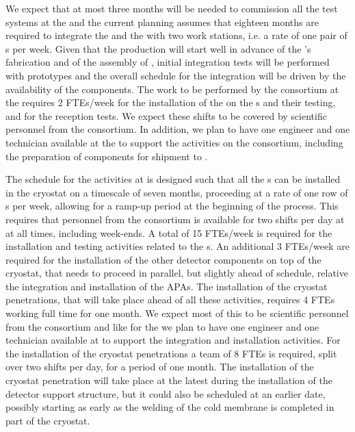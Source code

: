 We expect that at most three months will be needed to commission
all the test systems at the  and the current planning
assumes that eighteen months are required to integrate the 
and the  with two work stations, i.e.
a rate of one pair of s per week. Given that the 
production will start well in advance of the 's fabrication
and of the assembly of , initial integration tests will 
be performed with  prototypes and the overall schedule
for the integration will be driven by the availability of the 
components. The work to be performed by the 
consortium at the  requires 2 FTEs/week for the installation 
of the  on the s and their testing, and for 
the  reception tests. We expect these shifts to be covered 
by scientific personnel from the  consortium. In addition, 
we plan to have one engineer and one technician available at the 
 to support the activities on the consortium, including 
the preparation of components for shipment to \surf.

The schedule for the activities at \surf is designed such that all the
s can be installed in the cryostat on a timescale of seven
months, proceeding at a rate of one row of s per week, allowing
for a ramp-up period at the beginning of the process. This
requires that personnel from the  consortium is available
for two shifts per day at \surf at all times, including week-ends. A
total of 15 FTEs/week is required for the installation and testing 
activities related to the s. An additional 3 FTEs/week are
required for the installation of the other detector components on
top of the cryostat, that needs to proceed in parallel, but slightly
ahead of schedule, relative the integration and installation of the
APAs. The installation of the cryostat penetrations, that will take
place ahead of all these activities, requires 4 FTEs working full time
for one month. We expect most of this to be scientific personnel from
the  consortium and like for the  we plan
to have one engineer and one technician available at \surf to support
the integration and installation activities. For the installation of
the cryostat penetrations a team of 8 FTEs is required, split over
two shifts per day, for a period of one month. The installation of
the cryostat penetration will take place at the latest during the 
installation of the detector support structure, but it could also be
scheduled at an earlier date, possibly starting as early
as the welding of the cold membrane is completed in part of the cryostat.

